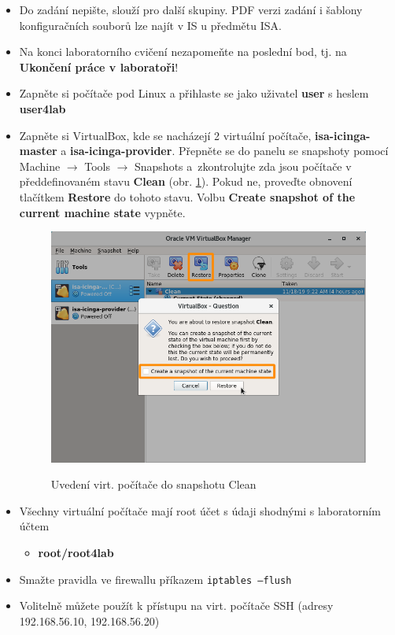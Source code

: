 \begin{itemize}
  \item Do zadání nepište, slouží pro další skupiny. PDF verzi zadání
  i šablony konfiguračních souborů lze najít v IS u předmětu ISA.
  
  \item Na konci laboratorního cvičení nezapomeňte na poslední bod,
  tj. na {\bf Ukončení práce v laboratoři}!
  
  \item Zapněte si počítače pod Linux a přihlaste se jako uživatel {\bf user} s heslem {\bf user4lab}
  \item Zapněte si VirtualBox, kde se nacházejí 2 virtuální počítače, {\bf isa-icinga-master} a {\bf isa-icinga-provider}. Přepněte se do panelu se snapshoty pomocí Machine $\rightarrow$ Tools $\rightarrow$ Snapshots a~zkontrolujte zda jsou počítače v předdefinovaném stavu {\bf Clean} (obr. \ref{fig:revert}). Pokud ne, proveďte obnovení tlačítkem {\bf Restore} do tohoto stavu. Volbu {\bf Create snapshot of the current machine state} vypněte.
  
  \begin{figure}[!ht]
  	\caption{Uvedení virt. počítače do snapshotu Clean}
  	\centering
  	\includegraphics[width=0.67\linewidth]{files/vbox-revert.png}
 	\label{fig:revert}
  \end{figure}

  \item Všechny virtuální počítače mají root účet s údaji shodnými s laboratorním účtem
            \begin{itemize}
                \item {\bf root/root4lab}
            \end{itemize}
  \item Smažte pravidla ve firewallu příkazem {\tt iptables --flush}
  
  \item Volitelně můžete použít k přístupu na virt. počítače SSH (adresy 192.168.56.10, 192.168.56.20)
\end{itemize}

